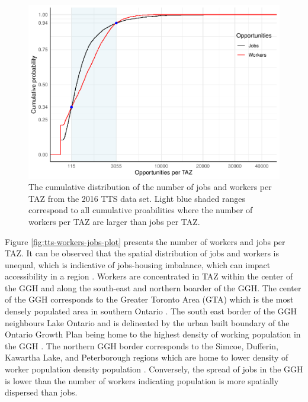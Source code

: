 \documentclass[Royal,times,sageh]{sagej}
\begin{document}
\begin{figure}
\includegraphics[width=1\linewidth]{Manuscript-Data-Package_files/figure-latex/ECD-plot-1} \caption{\label{fig:ECD-plot}The cumulative distribution of the number of jobs and workers per TAZ from the 2016 TTS data set. Light blue shaded ranges correspond to all cumulative proabilities where the number of workers per TAZ are larger than jobs per TAZ. }\label{fig:ECD-plot}
\end{figure}

Figure \ref{fig:tts-workers-jobs-plot} presents the number of workers
and jobs per TAZ. It can be observed that the spatial distribution of
jobs and workers is unequal, which is indicative of jobs-housing
imbalance, which can impact accessibility in a region
\citep{Levine1998rethinking}. Workers are concentrated in TAZ within the
center of the GGH and along the south-east and northern boarder of the
GGH. The center of the GGH corresponds to the Greater Toronto Area (GTA)
which is the most densely populated area in southern Ontario
\citep{statistics_canada_daily_2022}. The south east border of the GGH
neighbours Lake Ontario and is delineated by the urban built boundary of
the Ontario Growth Plan being home to the highest density of working
population in the GGH
\citep{ontario_built_2019, auditor_general_of_ontario_value_2021}. The
northern GGH border corresponds to the Simcoe, Dufferin, Kawartha Lake,
and Peterborough regions which are home to lower density of worker
population density population
\citep{auditor_general_of_ontario_value_2021}. Conversely, the spread of
jobs in the GGH is lower than the number of workers indicating
population is more spatially dispersed than jobs.
\end{document}
